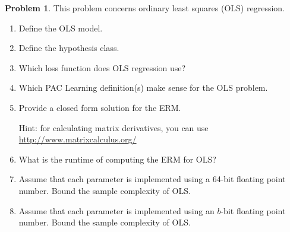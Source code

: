 \documentclass[10pt]{article}
\theoremstyle{definition}
\newtheorem{problem}{Problem}
\newcommand{\R}{\mathbb R}
\newcommand{\trans}[1]{{#1}^{T}}
\newcommand{\w}{\mathbf w}
\newcommand{\x}{\mathbf x}
\begin{document}
\newpage
\begin{problem}
    This problem concerns ordinary least squares (OLS) regression.
    \begin{enumerate}
        \item Define the OLS model.
            \vspace{2in}
        \item Define the hypothesis class.
            \vspace{2in}
        \item Which loss function does OLS regression use?
            \vspace{3in}
        \item Which PAC Learning definition(s) make sense for the OLS problem.
            \vspace{1in}

%

        \newpage
        \item Provide a closed form solution for the ERM.

            Hint: for calculating matrix derivatives, you can use \url{http://www.matrixcalculus.org/}
            \vspace{5in}
        \item What is the runtime of computing the ERM for OLS?
            \vspace{4in}

        \newpage
        \item Assume that each parameter is implemented using a 64-bit floating point number.
            Bound the sample complexity of OLS.
            \label{prob:bound1}
            \vspace{3in}
        \item Assume that each parameter is implemented using an $b$-bit floating point number.
            Bound the sample complexity of OLS.
            \label{prob:bound2}
            \vspace{3in}


\end{enumerate}
\end{problem}
\end{document}
